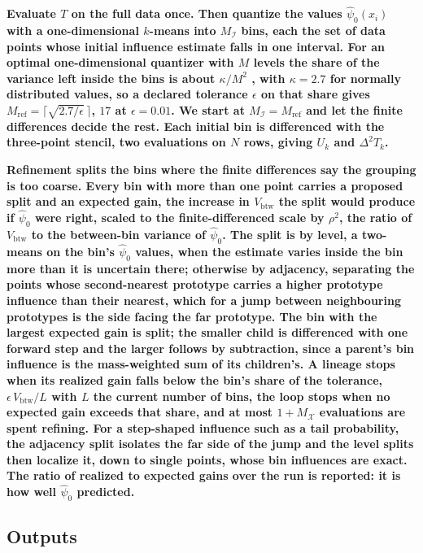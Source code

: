 \documentclass[runningheads]{llncs}
\newif\ifrev \revtrue
\newcommand{\rev}[1]{\ifrev{\color{blue}\bfseries #1}\else#1\fi}
\newcommand{\Vcell}{V_{\mathrm{btw}}}
\newcommand{\MX}{M_{\mathcal{X}}}
\newcommand{\MI}{M_{\mathcal{I}}}
\newcommand{\psinull}{\hat{\psi}_0}
\begin{document}
\rev{Evaluate $T$ on the full data once. Then quantize the values $\psinull(x_i)$ with a one-dimensional $k$-means into $\MI$ bins, each the set of data points whose initial influence estimate falls in one interval. For an optimal one-dimensional quantizer with $M$ levels the share of the variance left inside the bins is about $\kappa/M^2$ \cite{panter1951,graf2000}, with $\kappa = 2.7$ for normally distributed values, so a declared tolerance $\epsilon$ on that share gives $M_{\mathrm{ref}} = \lceil\sqrt{2.7/\epsilon}\,\rceil$, $17$ at $\epsilon = 0.01$. We start at $\MI = M_{\mathrm{ref}}$ and let the finite differences decide the rest. Each initial bin is differenced with the three-point stencil, two evaluations on $N$ rows, giving $U_k$ and $\Delta^2 T_k$.}

\rev{Refinement splits the bins where the finite differences say the grouping is too coarse. Every bin with more than one point carries a proposed split and an expected gain, the increase in $\Vcell$ the split would produce if $\psinull$ were right, scaled to the finite-differenced scale by $\rho^2$, the ratio of $\Vcell$ to the between-bin variance of $\psinull$. The split is by level, a two-means on the bin's $\psinull$ values, when the estimate varies inside the bin more than it is uncertain there; otherwise by adjacency, separating the points whose second-nearest prototype carries a higher prototype influence than their nearest, which for a jump between neighbouring prototypes is the side facing the far prototype. The bin with the largest expected gain is split; the smaller child is differenced with one forward step and the larger follows by subtraction, since a parent's bin influence is the mass-weighted sum of its children's. A lineage stops when its realized gain falls below the bin's share of the tolerance, $\epsilon\,\Vcell/L$ with $L$ the current number of bins, the loop stops when no expected gain exceeds that share, and at most $1 + \MX$ evaluations are spent refining. For a step-shaped influence such as a tail probability, the adjacency split isolates the far side of the jump and the level splits then localize it, down to single points, whose bin influences are exact. The ratio of realized to expected gains over the run is reported: it is how well $\psinull$ predicted.}

\subsection{Outputs}\label{sec:outputs}
\end{document}
